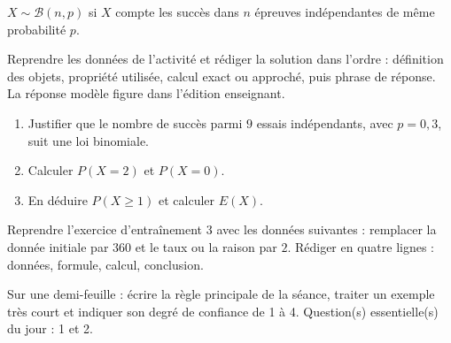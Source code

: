 \begin{traceecrite}$X\sim\mathcal B(n,p)$ si $X$ compte les succès dans $n$ épreuves indépendantes de même probabilité $p$.\end{traceecrite}

\begin{exemple}
Reprendre les données de l'activité et rédiger la solution dans l'ordre : définition des objets, propriété utilisée, calcul exact ou approché, puis phrase de réponse. La réponse modèle figure dans l'édition enseignant.
\end{exemple}

\begin{exercice}[-- essentiel]
\begin{enumerate}\item Justifier que le nombre de succès parmi $9$ essais indépendants, avec $p=0{,}3$, suit une loi binomiale.\item Calculer $P(X=2)$ et $P(X=0)$.\item En déduire $P(X\geq1)$ et calculer $E(X)$.\end{enumerate}
\end{exercice}


\begin{dm}Reprendre l'exercice d'entraînement 3 avec les données suivantes : remplacer la donnée initiale par $360$ et le taux ou la raison par $2$. Rédiger en quatre lignes : données, formule, calcul, conclusion.\end{dm}

\begin{sortie}Sur une demi-feuille : écrire la règle principale de la séance, traiter un exemple très court et indiquer son degré de confiance de 1 à 4. Question(s) essentielle(s) du jour : 1 et 2.\end{sortie}

